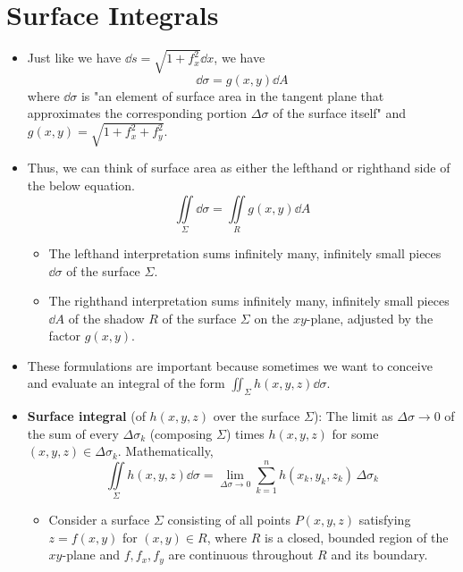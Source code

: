 \documentclass[../main.tex]{subfiles}
\begin{document}
\section{Surface Integrals}
\begin{itemize}
    \item {}Just like we have $\dd{s}=\sqrt{1+f_x^2}\dd{x}$, we have
    \begin{equation*}
        \dd{\sigma} = g(x,y)\dd{A}
    \end{equation*}
    where $\dd{\sigma}$ is "an element of surface area in the tangent plane that approximates the corresponding portion $\Delta\sigma$ of the surface itself" \parencite[581]{bib:Thomas} and $g(x,y)=\sqrt{1+f_x^2+f_y^2}$.
    \item Thus, we can think of surface area as either the lefthand or righthand side of the below equation.
    \begin{equation*}
        \iint\limits_\Sigma\dd{\sigma} = \iint\limits_Rg(x,y)\dd{A}
    \end{equation*}
    \begin{itemize}
        \item The lefthand interpretation sums infinitely many, infinitely small pieces $\dd{\sigma}$ of the surface $\Sigma$.
        \item The righthand interpretation sums infinitely many, infinitely small pieces $\dd{A}$ of the shadow $R$ of the surface $\Sigma$ on the $xy$-plane, adjusted by the factor $g(x,y)$.
    \end{itemize}
    \item These formulations are important because sometimes we want to conceive and evaluate an integral of the form $\iint_\Sigma h(x,y,z)\dd{\sigma}$.
    \item \textbf{Surface integral} (of $h(x,y,z)$ over the surface $\Sigma$): The limit as $\Delta\sigma\to 0$ of the sum of every $\Delta\sigma_k$ (composing $\Sigma$) times $h(x,y,z)$ for some $(x,y,z)\in\Delta\sigma_k$. Mathematically,
    \begin{equation*}
        \iint\limits_{\Sigma} h(x,y,z)\dd{\sigma} = \lim_{\Delta\sigma\to 0}\sum_{k=1}^nh(x_k,y_k,z_k)\, \Delta\sigma_k
    \end{equation*}
    \begin{itemize}
        \item Consider a surface $\Sigma$ consisting of all points $P(x,y,z)$ satisfying $z=f(x,y)$ for $(x,y)\in R$, where $R$ is a closed, bounded region of the $xy$-plane and $f,f_x,f_y$ are continuous throughout $R$ and its boundary.

\end{itemize}
\end{itemize}
\end{document}
